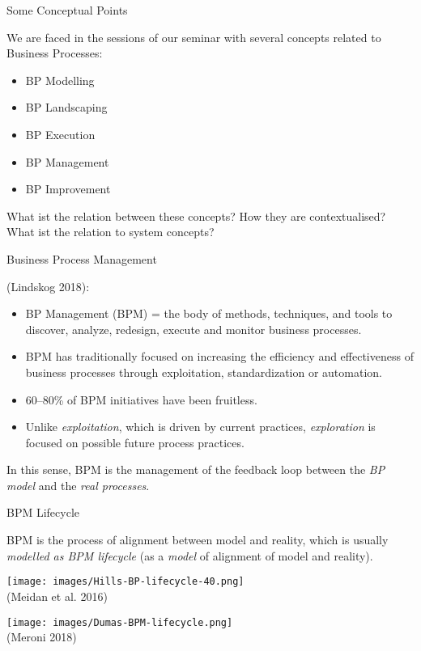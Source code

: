\documentclass{beamer}
\title{Exploitative and Explorative\\ Business Process Improvement \vskip1em}
\subtitle{Research Seminar in the Module 10-202-2309\\ for Master Computer
  Science}
\author{Prof. Dr. Hans-Gert Gräbe\\
\url{http://www.informatik.uni-leipzig.de/~graebe}}
\date{December 2021}
\begin{document}
{
\begin{frame}
  \titlepage
\end{frame}}

\begin{frame}{Some Conceptual Points}

We are faced in the sessions of our seminar with several concepts related
to Business Processes:
\begin{itemize}
\item BP Modelling
\item BP Landscaping
\item BP Execution
\item BP Management
\item BP Improvement
\end{itemize}

What ist the relation between these concepts? How they are contextualised?
What ist the relation to system concepts?

\end{frame}

\begin{frame}{Business Process Management}

(Lindskog 2018):
\begin{itemize}
\item BP Management (BPM) = the body of methods, techniques, and tools to
  discover, analyze, redesign, execute and monitor business processes.
\item BPM has traditionally focused on increasing the efficiency and
  effectiveness of business processes through exploitation, standardization or
  automation.
\item 60–80\% of BPM initiatives have been fruitless.
\item Unlike \emph{exploitation}, which is driven by current practices,
  \emph{exploration} is focused on possible future process practices.
\end{itemize}

In this sense, BPM is the management of the feedback loop between the \emph{BP
  model} and the \emph{real processes}.
\end{frame}
\begin{frame}{BPM Lifecycle}

BPM is the process of alignment between model and reality, which is usually
\emph{modelled as BPM lifecycle} (as a \emph{model} of alignment of model and
reality).
  \begin{center}
    \begin{minipage}[b]{.45\textwidth}\centering
      \texttt{[image: images/Hills-BP-lifecycle-40.png]}\\
      (Meidan et al. 2016)
    \end{minipage}
    \hfill 
    \begin{minipage}[b]{.45\textwidth}\centering
      \texttt{[image: images/Dumas-BPM-lifecycle.png]}\\
      (Meroni 2018)
    \end{minipage}
  \end{center}
\end{frame}
\end{document}
